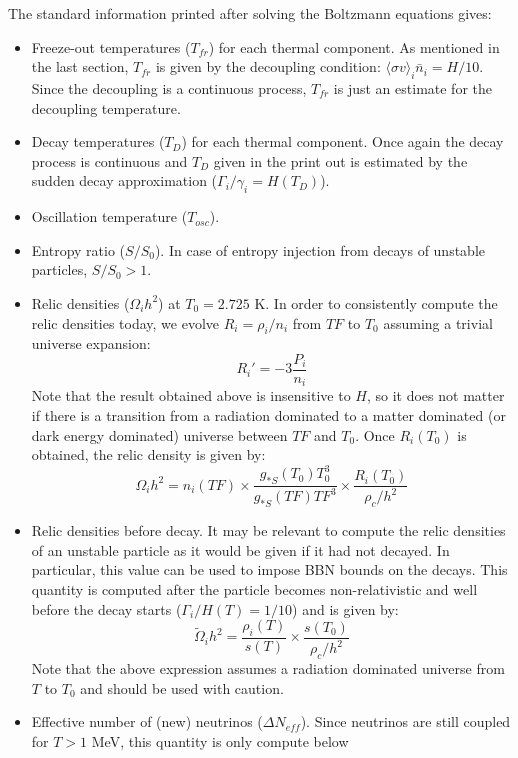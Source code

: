 \documentclass[preprint,notoc]{JHEP3}
\def\sigv{\langle \sigma v \rangle}
\begin{document}
The standard information printed after solving the Boltzmann equations gives:
\begin{itemize}
\item Freeze-out temperatures ($T_{fr}$) for each thermal component. As mentioned in the last section, $T_{fr}$ is
given by the decoupling condition: $\sigv_i \bar{n}_i = H/10$. Since the decoupling is a continuous process, $T_{fr}$
is just an estimate for the decoupling temperature.
\item Decay temperatures ($T_D$) for each thermal component. Once again the decay process is continuous and $T_D$ given in
the print out is estimated by the sudden decay approximation ($\Gamma_i/\gamma_i = H(T_D)$).
\item Oscillation temperature ($T_{osc}$).
\item Entropy ratio ($S/S_0$). In case of entropy injection from decays of unstable particles, $S/S_0 > 1$.
\item Relic densities ($\Omega_i h^2$) at $T_0 = 2.725$ K. In order to consistently compute the relic densities today,
we evolve $R_i = \rho_i/n_i$ from $TF$ to $T_0$ assuming a trivial universe expansion:
\begin{equation}
R_i' = - 3 \frac{P_i}{n_i}
\end{equation}
Note that the result obtained above is insensitive to $H$, so it does not matter if there is a transition from
a radiation dominated to a matter dominated (or dark energy dominated) universe between $TF$ and $T_0$. Once $R_i(T_0)$
is obtained, the relic density is given by:
\begin{equation}
\Omega_i h^2 = n_i(TF) \times \frac{g_{*S}(T_0) T_0^3}{g_{*S}(TF) TF^3} \times \frac{R_i(T_0)}{\rho_c/h^2}
\end{equation}
\item Relic densities before decay. It may be relevant to compute the relic densities of an unstable particle as it would be given
if it had not decayed. In particular, this value can be used to impose BBN bounds on the decays. This quantity is computed after
the particle becomes non-relativistic and well before the decay starts ($\Gamma_i/H(T) = 1/10$)  and is given by:
\begin{equation}
\tilde{\Omega}_i h^2 = \frac{\rho_i(T)}{s(T)} \times \frac{s(T_0)}{\rho_c/h^2}
\end{equation}
Note that the above expression assumes a radiation dominated universe from $T$ to $T_0$ and should be used with caution.
\item Effective number of (new) neutrinos ($\Delta N_{eff}$). Since neutrinos are still coupled for $T > 1$ MeV, this quantity is only compute below

\end{itemize}
\end{document}
